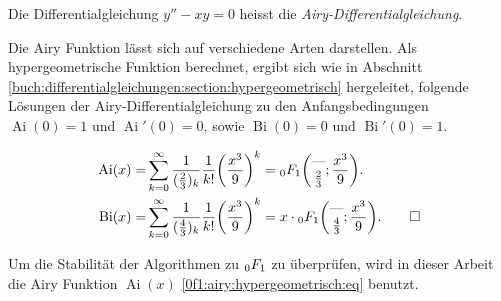 \begin{definition}
    \label{0f1:airy:differentialgleichung:def}
    Die Differentialgleichung
    $y'' - xy = 0$
    heisst die {\em Airy-Differentialgleichung}.
\end{definition}

Die Airy Funktion lässt sich auf verschiedene Arten darstellen. 
Als hypergeometrische Funktion berechnet, ergibt sich wie in Abschnitt \ref{buch:differentialgleichungen:section:hypergeometrisch} hergeleitet, folgende Lösungen der Airy-Differentialgleichung zu den Anfangsbedingungen $\operatorname{Ai}(0)=1$ und $\operatorname{Ai}'(0)=0$, sowie $\operatorname{Bi}(0)=0$ und $\operatorname{Bi}'(0)=1$.

\begin{align}
\label{0f1:airy:hypergeometrisch:eq}
\operatorname{Ai}(x)
=&
\sum_{k=0}^\infty
\frac{1}{(\frac23)_k} \frac{1}{k!}\biggl(\frac{x^3}{9}\biggr)^k
=
\mathstrut_0F_1\biggl(
\begin{matrix}\text{---}\\\frac23\end{matrix};\frac{x^3}{9}
\biggr).
\\
\operatorname{Bi}(x)
=&
\sum_{k=0}^\infty
\frac{1}{(\frac43)_k} \frac{1}{k!}\biggl(\frac{x^3}{9}\biggr)^k
=
x\cdot\mathstrut_0F_1\biggl(
\begin{matrix}\text{---}\\\frac43\end{matrix};
\frac{x^3}{9}
\biggr).
\qedhere
\end{align}

Um die Stabilität der Algorithmen zu $\mathstrut_0F_1$ zu überprüfen, wird in dieser Arbeit die Airy Funktion $\operatorname{Ai}(x)$ \eqref{0f1:airy:hypergeometrisch:eq}
benutzt.


